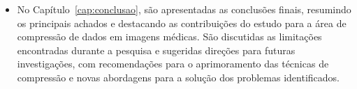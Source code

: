 \begin{itemize}
    \item No Capítulo~\ref{cap:conclusao}, são apresentadas as conclusões finais, resumindo os principais achados e destacando as contribuições do estudo para a área de compressão de dados em imagens médicas. São discutidas as limitações encontradas durante a pesquisa e sugeridas direções para futuras investigações, com recomendações para o aprimoramento das técnicas de compressão e novas abordagens para a solução dos problemas identificados.
\end{itemize}




